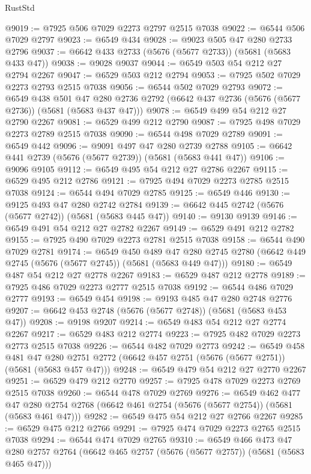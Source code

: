\begin{lexlean}{RustStd}
\begin{coremodule}
@9019 := @7925 @506 @7029 @2273 @2797 @2515 @7038
@9022 := @6544 @506 @7029 @2797
@9023 := @6549 @434
@9028 := @9023 @505 @47 @280 @2733 @2796
@9037 := @6642 @433 @2733 (@5676 (@5677 @2733)) (@5681 (@5683 @433 @47))
@9038 := @9028 @9037
@9044 := @6549 @503 @54 @212 @27 @2794 @2267
@9047 := @6529 @503 @212 @2794
@9053 := @7925 @502 @7029 @2273 @2793 @2515 @7038
@9056 := @6544 @502 @7029 @2793
@9072 := @6549
    @438
    @501
    @47
    @280
    @2736
    @2792
    (@6642 @437 @2736 (@5676 (@5677 @2736)) (@5681 (@5683 @437 @47)))
@9078 := @6549 @499 @54 @212 @27 @2790 @2267
@9081 := @6529 @499 @212 @2790
@9087 := @7925 @498 @7029 @2273 @2789 @2515 @7038
@9090 := @6544 @498 @7029 @2789
@9091 := @6549 @442
@9096 := @9091 @497 @47 @280 @2739 @2788
@9105 := @6642 @441 @2739 (@5676 (@5677 @2739)) (@5681 (@5683 @441 @47))
@9106 := @9096 @9105
@9112 := @6549 @495 @54 @212 @27 @2786 @2267
@9115 := @6529 @495 @212 @2786
@9121 := @7925 @494 @7029 @2273 @2785 @2515 @7038
@9124 := @6544 @494 @7029 @2785
@9125 := @6549 @446
@9130 := @9125 @493 @47 @280 @2742 @2784
@9139 := @6642 @445 @2742 (@5676 (@5677 @2742)) (@5681 (@5683 @445 @47))
@9140 := @9130 @9139
@9146 := @6549 @491 @54 @212 @27 @2782 @2267
@9149 := @6529 @491 @212 @2782
@9155 := @7925 @490 @7029 @2273 @2781 @2515 @7038
@9158 := @6544 @490 @7029 @2781
@9174 := @6549
    @450
    @489
    @47
    @280
    @2745
    @2780
    (@6642 @449 @2745 (@5676 (@5677 @2745)) (@5681 (@5683 @449 @47)))
@9180 := @6549 @487 @54 @212 @27 @2778 @2267
@9183 := @6529 @487 @212 @2778
@9189 := @7925 @486 @7029 @2273 @2777 @2515 @7038
@9192 := @6544 @486 @7029 @2777
@9193 := @6549 @454
@9198 := @9193 @485 @47 @280 @2748 @2776
@9207 := @6642 @453 @2748 (@5676 (@5677 @2748)) (@5681 (@5683 @453 @47))
@9208 := @9198 @9207
@9214 := @6549 @483 @54 @212 @27 @2774 @2267
@9217 := @6529 @483 @212 @2774
@9223 := @7925 @482 @7029 @2273 @2773 @2515 @7038
@9226 := @6544 @482 @7029 @2773
@9242 := @6549
    @458
    @481
    @47
    @280
    @2751
    @2772
    (@6642 @457 @2751 (@5676 (@5677 @2751)) (@5681 (@5683 @457 @47)))
@9248 := @6549 @479 @54 @212 @27 @2770 @2267
@9251 := @6529 @479 @212 @2770
@9257 := @7925 @478 @7029 @2273 @2769 @2515 @7038
@9260 := @6544 @478 @7029 @2769
@9276 := @6549
    @462
    @477
    @47
    @280
    @2754
    @2768
    (@6642 @461 @2754 (@5676 (@5677 @2754)) (@5681 (@5683 @461 @47)))
@9282 := @6549 @475 @54 @212 @27 @2766 @2267
@9285 := @6529 @475 @212 @2766
@9291 := @7925 @474 @7029 @2273 @2765 @2515 @7038
@9294 := @6544 @474 @7029 @2765
@9310 := @6549
    @466
    @473
    @47
    @280
    @2757
    @2764
    (@6642 @465 @2757 (@5676 (@5677 @2757)) (@5681 (@5683 @465 @47)))

\end{coremodule}
\end{lexlean}
